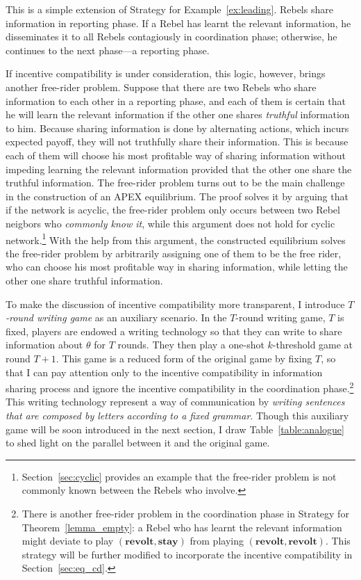 \documentclass[12pt,letter]{article}
\theoremstyle{definition}
\theoremstyle{definition}
\theoremstyle{remark}
\theoremstyle{claim}
\begin{document}
This is a simple extension of Strategy for Example~\ref{ex:leading}. Rebels share information in reporting phase. If a Rebel has learnt the relevant information, he disseminates it to all Rebels contagiously in coordination phase; otherwise, he continues to the next phase---a reporting phase. 

If incentive compatibility is under consideration, this logic, however, brings another free-rider problem. Suppose that there are two Rebels who share information to each other in a reporting phase, and each of them is certain that he will learn the relevant information if the other one shares \textit{truthful} information to him. Because sharing information is done by alternating actions, which incurs expected payoff, they will not truthfully share their information. This is because each of them will choose his most profitable way of sharing information without impeding learning the relevant information provided that the other one share the truthful information. The free-rider problem turns out to be the main challenge in the construction of an APEX equilibrium. The proof solves it by arguing that if the network is acyclic, the free-rider problem only occurs between two Rebel neigbors who \textit{commonly know it}, while this argument does not hold for cyclic network.\footnote{Section~\ref{sec:cyclic} provides an example that the free-rider problem is not commonly known between the Rebels who involve.} 
With the help from this argument, the constructed equilibrium solves the free-rider problem by arbitrarily assigning one of them to be the {free rider}, who can choose his most profitable way in sharing information, while letting the other one share truthful information. 

To make the discussion of incentive compatibility more transparent, I introduce \textit{$T$-round writing game} as an auxiliary scenario. In the $T$-round writing game, $T$ is fixed, players are endowed a writing technology so that they can write to share information about $\theta$ for $T$ rounds. They then play a one-shot $k$-threshold game at round $T+1$. This game is a reduced form of the original game by fixing $T$, so that I can pay attention only to the incentive compatibility in information sharing process and ignore the incentive compatibility in the coordination phase.\footnote{There is another free-rider problem in the coordination phase in Strategy for Theorem~\ref{lemma_empty}: a Rebel who has learnt the relevant information might deviate to play $(\textbf{revolt},\textbf{stay})$ from playing $(\textbf{revolt},\textbf{revolt})$. This strategy will be further modified to incorporate the incentive compatibility in Section~\ref{sec:eq_cd}.} 
This writing technology represent a way of communication by \textit{writing sentences that are composed by letters according to a fixed grammar}. Though this auxiliary game will be soon introduced in the next section, I draw Table~\ref{table:analogue} to shed light on the parallel between it and the original game.
\end{document}
